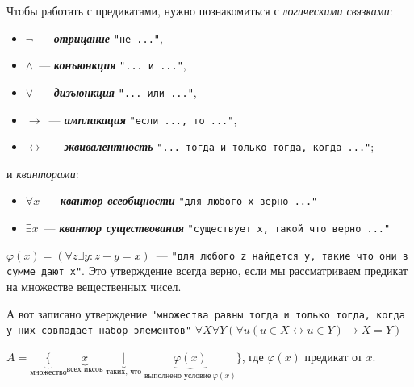 \documentclass{article}
\begin{document}
    \begin{definition_boxed}
        Чтобы работать с предикатами, нужно познакомиться с \textit{логическими связками}:
        \begin{itemize}
            \item $\neg$~--- \textbf{\textit{отрицание}} \texttt{"не ..."},

            \item $\wedge$~--- \textbf{\textit{конъюнкция}}  \texttt{"... и ..."},

            \item $\vee$~--- \textbf{\textit{дизъюнкция}}  \texttt{"... или ..."},

            \item $\rightarrow$~--- \textbf{\textit{импликация}}  \texttt{"если ..., то ..."},

            \item $\leftrightarrow$~--- \textbf{\textit{эквивалентность}}  \texttt{"... тогда и только тогда, когда ..."};
        \end{itemize}
        и {\textit{кванторами}}:
        \begin{itemize}
            \item $\forall x$~--- \textbf{\textit{квантор всеобщности}}  \texttt{"для любого х верно ..."}

            \item $\exists x$~--- \textbf{\textit{квантор существования}}  \texttt{"существует х, такой что верно ..."}
        \end{itemize}
    \end{definition_boxed}

    \begin{example}
        $\varphi(x) = (\forall z \exists y: z + y = x)$~--- \texttt{"для любого z найдется y, такие что они в сумме дают x"}.
        Это утверждение всегда верно, если мы рассматриваем предикат на множестве вещественных чисел.
    \end{example}

    \begin{example}
        А вот записано утверждение \texttt{"множества равны тогда и только тогда, когда у них совпадает набор элементов"}
        $\forall X\forall Y(\forall u(u \in X \leftrightarrow u \in Y) \rightarrow X = Y)$
    \end{example}

    \begin{definition_boxed}
        $A = \underbrace{\{}_{\text{множество}}\underbrace{x}_{\text{всех иксов}} \underbrace{\mid}_{\text{таких, что}} \underbrace{\varphi(x)}_{\text{выполнено условие} \ \varphi(x)}\}$, где $\varphi(x)$ предикат от $x$.

    \end{definition_boxed}
\end{document}
